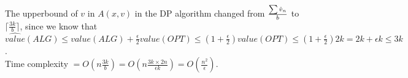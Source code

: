 \begin{pr}
The upperbound of $v$ in $A(x, v)$ in the DP algorithm changed from $\frac{\sum\limits\hat v_n}b$ to $\lceil\frac{3k}b\rceil$, since we know that $\hat{value}(ALG)\leq value(ALG)+\frac{\epsilon}2value(OPT)\leq(1+\frac\epsilon2)value(OPT)\leq(1+\frac\epsilon2)2k=2k+\epsilon k\leq3k$.\\
Time complexity $=O(n\frac{3k}b)=O(n\frac{3k\times2n}{\epsilon k})=O(\frac{n^2}\epsilon)$.
\end{pr}
